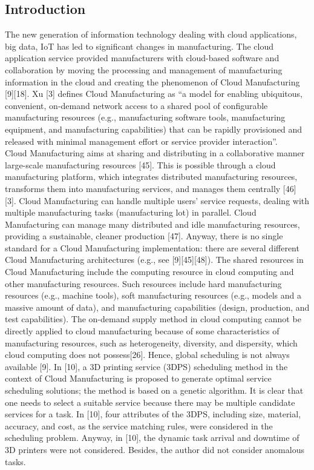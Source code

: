 \subsection{Introduction}
The new generation of information technology dealing with cloud applications, big data, IoT has led to significant changes in manufacturing. The cloud application service provided manufacturers with cloud-based software and collaboration by moving the processing and management of manufacturing information in the cloud and creating the phenomenon of Cloud Manufacturing [9][18]. Xu [3] defines Cloud Manufacturing as “a model for enabling ubiquitous, convenient, on-demand network access to a shared pool of configurable manufacturing resources (e.g., manufacturing software tools, manufacturing equipment, and manufacturing capabilities) that can be rapidly provisioned and released with minimal management effort or service provider interaction”.\\
Cloud Manufacturing aims at sharing and distributing in a collaborative manner large-scale manufacturing resources [45]. This is possible through a cloud manufacturing platform, which integrates distributed manufacturing resources, transforms them into manufacturing services, and manages them centrally [46] [3]. Cloud Manufacturing can handle multiple users’ service requests, dealing with multiple manufacturing tasks (manufacturing lot) in parallel. Cloud Manufacturing can manage many distributed and idle manufacturing resources, providing a sustainable, cleaner production [47]. Anyway, there is no single standard for a Cloud Manufacturing implementation: there are several different Cloud Manufacturing architectures (e.g., see [9][45][48]). The shared resources in Cloud Manufacturing include the computing resource in cloud computing and other manufacturing resources. Such resources include hard manufacturing resources (e.g., machine tools), soft manufacturing resources (e.g., models and a massive amount of data), and manufacturing capabilities (design, production, and test capabilities). The on-demand supply method in cloud computing cannot be directly applied to cloud manufacturing because of some characteristics of manufacturing resources, such as heterogeneity, diversity, and dispersity, which cloud computing does not possess[26]. Hence, global scheduling is not always available [9]. In [10], a 3D printing service (3DPS) scheduling method in the context of Cloud Manufacturing is proposed to generate optimal service scheduling solutions; the method is based on a genetic algorithm. It is clear that one needs to select a suitable service because there may be multiple candidate services for a task. In [10], four attributes of the 3DPS, including size, material, accuracy, and cost, as the service matching rules, were considered in the scheduling problem. Anyway, in [10], the dynamic task arrival and downtime of 3D printers were not considered. Besides, the author did not consider anomalous tasks.
